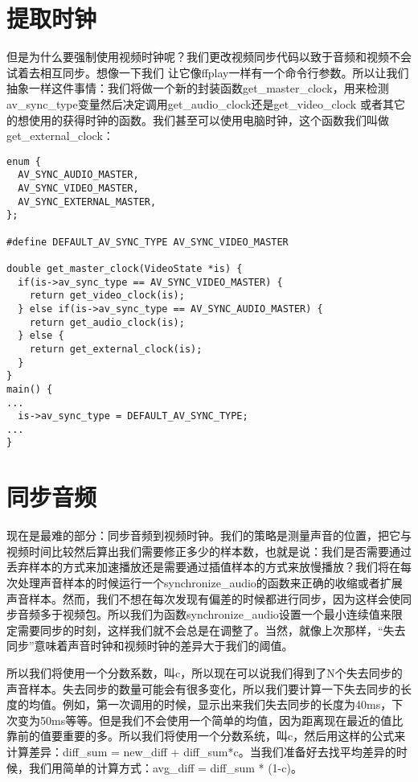 \section{提取时钟}
但是为什么要强制使用视频时钟呢？我们更改视频同步代码以致于音频和视频不会试着去相互同步。想像一下我们 让它像ffplay一样有一个命令行参数。所以让我们抽象一样这件事情：我们将做一个新的封装函数get_master_clock，用来检测av_sync_type变量然后决定调用get_audio_clock还是get_video_clock 或者其它的想使用的获得时钟的函数。我们甚至可以使用电脑时钟，这个函数我们叫做get_external_clock：

\begin{lstlisting}
enum {
  AV_SYNC_AUDIO_MASTER,
  AV_SYNC_VIDEO_MASTER,
  AV_SYNC_EXTERNAL_MASTER,
};

#define DEFAULT_AV_SYNC_TYPE AV_SYNC_VIDEO_MASTER

double get_master_clock(VideoState *is) {
  if(is->av_sync_type == AV_SYNC_VIDEO_MASTER) {
    return get_video_clock(is);
  } else if(is->av_sync_type == AV_SYNC_AUDIO_MASTER) {
    return get_audio_clock(is);
  } else {
    return get_external_clock(is);
  }
}
main() {
...
  is->av_sync_type = DEFAULT_AV_SYNC_TYPE;
...
}
\end{lstlisting}

\section{同步音频}

现在是最难的部分：同步音频到视频时钟。我们的策略是测量声音的位置，把它与视频时间比较然后算出我们需要修正多少的样本数，也就是说：我们是否需要通过丢弃样本的方式来加速播放还是需要通过插值样本的方式来放慢播放？我们将在每次处理声音样本的时候运行一个synchronize_audio的函数来正确的收缩或者扩展声音样本。然而，我们不想在每次发现有偏差的时候都进行同步，因为这样会使同步音频多于视频包。所以我们为函数synchronize_audio设置一个最小连续值来限定需要同步的时刻，这样我们就不会总是在调整了。当然，就像上次那样，“失去同步”意味着声音时钟和视频时钟的差异大于我们的阈值。

所以我们将使用一个分数系数，叫c，所以现在可以说我们得到了N个失去同步的声音样本。失去同步的数量可能会有很多变化，所以我们要计算一下失去同步的长度的均值。例如，第一次调用的时候，显示出来我们失去同步的长度为40ms，下次变为50ms等等。但是我们不会使用一个简单的均值，因为距离现在最近的值比靠前的值要重要的多。所以我们将使用一个分数系统，叫c，然后用这样的公式来计算差异：diff_sum = new_diff + diff_sum*c。当我们准备好去找平均差异的时候，我们用简单的计算方式：avg_diff = diff_sum * (1-c)。

